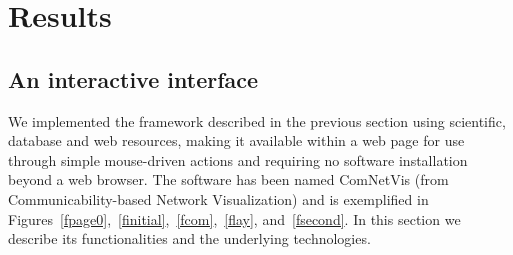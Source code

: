 \documentclass[Afour,sagev,times]{sagej}
\begin{document}
\section{Results}
\subsection{An interactive interface}\label{sint}
We implemented the framework described in the previous section using scientific,
database and web resources, making it available within a web page
for use through simple mouse-driven actions and requiring no software installation beyond a web browser. %
The software has been named ComNetVis (from Communicability-based Network Visualization)
and is exemplified in Figures~\ref{fpage0},~\ref{finitial},~\ref{fcom},~\ref{flay}, and~\ref{fsecond}.
In this section we describe its functionalities and the underlying technologies.
\end{document}
